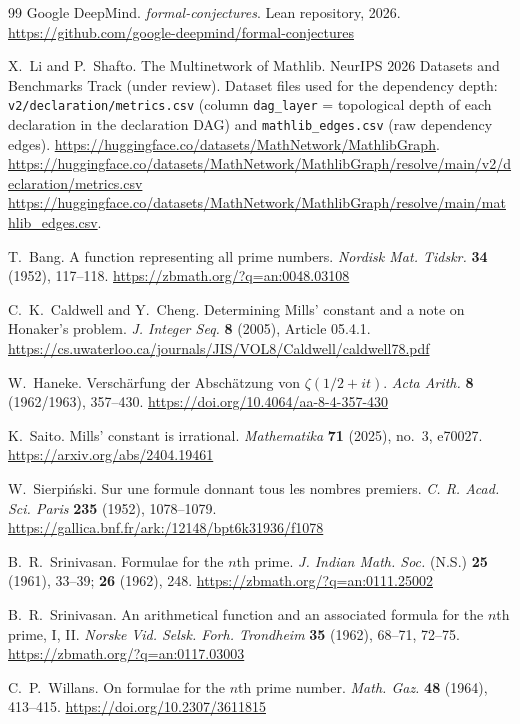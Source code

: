 \documentclass[11pt,reqno]{amsart}
\theoremstyle{redplain}
\numberwithin{equation}{section}
\begin{document}
\begin{thebibliography}{99}
	 Google DeepMind. \emph{formal-conjectures}. Lean
	repository, 2026.
	\url{https://github.com/google-deepmind/formal-conjectures}
	
	 X.~Li and P.~Shafto. The Multinetwork of
	Mathlib. NeurIPS 2026 Datasets and Benchmarks Track (under review).
	Dataset files used for the dependency depth: \texttt{v2/declaration/metrics.csv}
	(column \texttt{dag\_layer} = topological depth of each declaration in the
	declaration DAG) and \texttt{mathlib\_edges.csv} (raw dependency edges).
	{\scriptsize
		\url{https://huggingface.co/datasets/MathNetwork/MathlibGraph}.\newline
		\url{https://huggingface.co/datasets/MathNetwork/MathlibGraph/resolve/main/v2/declaration/metrics.csv}\newline
		\url{https://huggingface.co/datasets/MathNetwork/MathlibGraph/resolve/main/mathlib_edges.csv}.}
	
	 T.~Bang. A function representing all prime numbers. \emph{Nordisk Mat.
		Tidskr.} \textbf{34} (1952), 117--118.
	\url{https://zbmath.org/?q=an:0048.03108}
	
	 C.~K.~Caldwell and Y.~Cheng. Determining Mills'
	constant and a note on Honaker's problem. \emph{J. Integer Seq.} \textbf{8}
	(2005), Article 05.4.1.
	\url{https://cs.uwaterloo.ca/journals/JIS/VOL8/Caldwell/caldwell78.pdf}
	
	 W.~Haneke. Versch\"arfung der Absch\"atzung von
	$\zeta(1/2+it)$. \emph{Acta Arith.} \textbf{8} (1962/1963), 357--430.
	\url{https://doi.org/10.4064/aa-8-4-357-430}
	
	 K.~Saito. Mills' constant is irrational. \emph{Mathematika}
	\textbf{71} (2025), no.~3, e70027.
	\url{https://arxiv.org/abs/2404.19461}
	
	 W.~Sierpi\'nski. Sur une formule donnant tous les
	nombres premiers. \emph{C. R. Acad. Sci. Paris} \textbf{235} (1952), 1078--1079.
	\url{https://gallica.bnf.fr/ark:/12148/bpt6k31936/f1078}
	
	 B.~R.~Srinivasan. Formulae for the $n$th prime.
	\emph{J. Indian Math. Soc.} (N.S.) \textbf{25} (1961), 33--39; \textbf{26}
	(1962), 248.
	\url{https://zbmath.org/?q=an:0111.25002}
	
	 B.~R.~Srinivasan. An arithmetical function and an
	associated formula for the $n$th prime, I, II. \emph{Norske Vid. Selsk. Forh.
		Trondheim} \textbf{35} (1962), 68--71, 72--75.
	\url{https://zbmath.org/?q=an:0117.03003}
	
	 C.~P.~Willans. On formulae for the $n$th prime number.
	\emph{Math. Gaz.} \textbf{48} (1964), 413--415.
	\url{https://doi.org/10.2307/3611815}
	
\end{thebibliography}
\end{document}
